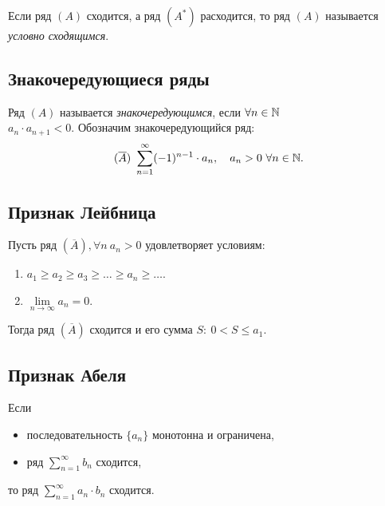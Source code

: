 \begin{definition}
    Если ряд $(A)$ сходится, а ряд $(A^*)$ расходится, то ряд $(A)$ называется \emph{условно сходящимся}.
\end{definition}

\subsection{Знакочередующиеся ряды}

\begin{definition}
    Ряд $(A)$ называется \emph{знакочередующимся}, если $\forall n \in \mathbb{N} $ \\ $ a_n \cdot a_{n+1} < 0$. Обозначим знакочередующийся ряд:
    \[
        (\overline{A}) \ \sum_{n=1}^{\infty}(-1)^{n-1}\cdot a_n, \quad a_n > 0 \ \forall n \in\N.
    \]
\end{definition}

\subsection{Признак Лейбница}

\begin{theorem}
    Пусть ряд $(\overline{A}), \forall n \ a_n > 0 $ удовлетворяет условиям:
    \begin{enumerate}
        \item $a_1 \geqslant a_2 \geqslant a_3 \geqslant \ldots \geqslant a_n \geqslant \ldots$.
        \item $\underset{n\rightarrow\infty}{\lim} a_n = 0$.
    \end{enumerate}

    Тогда ряд $(\overline{A})$ сходится и его сумма $S: \ 0 < S \leqslant a_1$.
\end{theorem}

\subsection{Признак Абеля}

\begin{theorem}
    Если \begin{itemize}
        \item последовательность $\{a_n\}$ монотонна и ограничена,
        \item ряд $\sum_{n=1}^{\infty} b_n$ сходится,
    \end{itemize}
    то ряд $\sum_{n=1}^{\infty}a_n \cdot b_n$ сходится.
\end{theorem}

